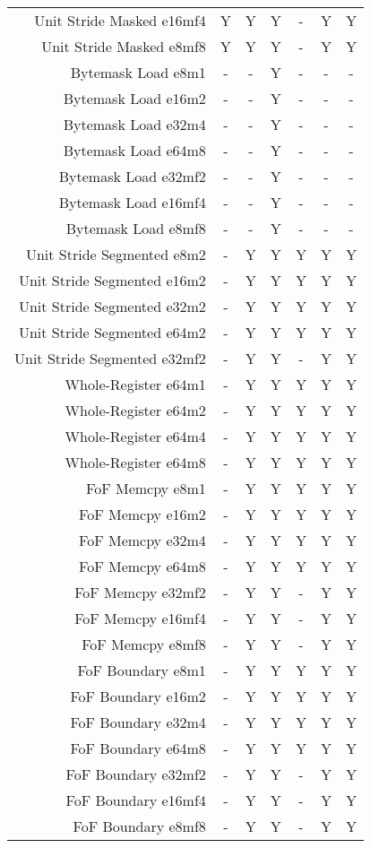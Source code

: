 \begin{longtable}{rcccccc}
Unit Stride Masked e16mf4 & Y & Y & Y & - & Y & Y\\
Unit Stride Masked e8mf8 & Y & Y & Y & - & Y & Y\\
Bytemask Load e8m1 & - & - & Y & - & - & -\\
Bytemask Load e16m2 & - & - & Y & - & - & -\\
Bytemask Load e32m4 & - & - & Y & - & - & -\\
Bytemask Load e64m8 & - & - & Y & - & - & -\\
Bytemask Load e32mf2 & - & - & Y & - & - & -\\
Bytemask Load e16mf4 & - & - & Y & - & - & -\\
Bytemask Load e8mf8 & - & - & Y & - & - & -\\
Unit Stride Segmented e8m2 & - & Y & Y & Y & Y & Y\\
Unit Stride Segmented e16m2 & - & Y & Y & Y & Y & Y\\
Unit Stride Segmented e32m2 & - & Y & Y & Y & Y & Y\\
Unit Stride Segmented e64m2 & - & Y & Y & Y & Y & Y\\
Unit Stride Segmented e32mf2 & - & Y & Y & - & Y & Y\\
Whole-Register e64m1 & - & Y & Y & Y & Y & Y\\
Whole-Register e64m2 & - & Y & Y & Y & Y & Y\\
Whole-Register e64m4 & - & Y & Y & Y & Y & Y\\
Whole-Register e64m8 & - & Y & Y & Y & Y & Y\\
FoF Memcpy e8m1 & - & Y & Y & Y & Y & Y\\
FoF Memcpy e16m2 & - & Y & Y & Y & Y & Y\\
FoF Memcpy e32m4 & - & Y & Y & Y & Y & Y\\
FoF Memcpy e64m8 & - & Y & Y & Y & Y & Y\\
FoF Memcpy e32mf2 & - & Y & Y & - & Y & Y\\
FoF Memcpy e16mf4 & - & Y & Y & - & Y & Y\\
FoF Memcpy e8mf8 & - & Y & Y & - & Y & Y\\
FoF Boundary e8m1 & - & Y & Y & Y & Y & Y\\
FoF Boundary e16m2 & - & Y & Y & Y & Y & Y\\
FoF Boundary e32m4 & - & Y & Y & Y & Y & Y\\
FoF Boundary e64m8 & - & Y & Y & Y & Y & Y\\
FoF Boundary e32mf2 & - & Y & Y & - & Y & Y\\
FoF Boundary e16mf4 & - & Y & Y & - & Y & Y\\
FoF Boundary e8mf8 & - & Y & Y & - & Y & Y\\
\bottomrule
\end{longtable}
